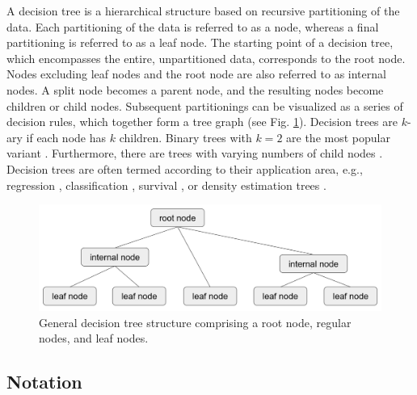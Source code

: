 \documentclass[a4paper, 11pt]{article}
\begin{document}
A decision tree is a hierarchical structure based on recursive partitioning of the data. Each partitioning of the data is referred to as a node, whereas a final partitioning is referred to as a leaf node.
The starting point of a decision tree, which encompasses the entire, unpartitioned data, corresponds to the root node. Nodes excluding leaf nodes and the root node are also referred to as internal nodes.
A split node becomes a parent node, and the resulting nodes become children or child nodes. Subsequent partitionings can be visualized as a series of decision rules, which together form a tree graph (see Fig. \ref{fig:tree_structure}). Decision trees are $k$-ary if each node has $k$ children.
Binary trees with $k = 2$ are the most popular variant \cite{hastie_elemstatlearn}. Furthermore, there are trees with varying numbers of child nodes \cite{quinlan_c45}. Decision trees are often termed according to their application area, e.g., regression \cite{cart_1}, classification \cite{quinlan_c45, cart_1, kass_chaid}, survival \cite{derose_survival_tree}, or density estimation trees \cite{ram_density_estimation_tree}.

\begin{figure}
    \centering
    \includegraphics[width = 0.8 \linewidth]{thesis/figure/decision_tree_structure.png}
    \caption{General decision tree structure comprising a root node, regular nodes, and leaf nodes.}
    \label{fig:tree_structure}
\end{figure}

\subsection{Notation}
\end{document}
